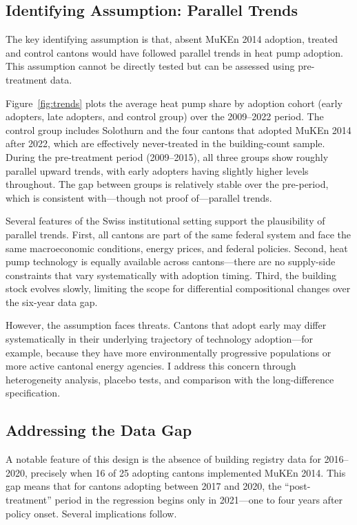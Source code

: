 \documentclass[12pt]{article}
\begin{document}
\subsection{Identifying Assumption: Parallel Trends}

The key identifying assumption is that, absent MuKEn 2014 adoption, treated and control cantons would have followed parallel trends in heat pump adoption. This assumption cannot be directly tested but can be assessed using pre-treatment data.

Figure~\ref{fig:trends} plots the average heat pump share by adoption cohort (early adopters, late adopters, and control group) over the 2009--2022 period. The control group includes Solothurn and the four cantons that adopted MuKEn 2014 after 2022, which are effectively never-treated in the building-count sample. During the pre-treatment period (2009--2015), all three groups show roughly parallel upward trends, with early adopters having slightly higher levels throughout. The gap between groups is relatively stable over the pre-period, which is consistent with---though not proof of---parallel trends.

Several features of the Swiss institutional setting support the plausibility of parallel trends. First, all cantons are part of the same federal system and face the same macroeconomic conditions, energy prices, and federal policies. Second, heat pump technology is equally available across cantons---there are no supply-side constraints that vary systematically with adoption timing. Third, the building stock evolves slowly, limiting the scope for differential compositional changes over the six-year data gap.

However, the assumption faces threats. Cantons that adopt early may differ systematically in their underlying trajectory of technology adoption---for example, because they have more environmentally progressive populations or more active cantonal energy agencies. I address this concern through heterogeneity analysis, placebo tests, and comparison with the long-difference specification.

\subsection{Addressing the Data Gap}

A notable feature of this design is the absence of building registry data for 2016--2020, precisely when 16 of 25 adopting cantons implemented MuKEn 2014. This gap means that for cantons adopting between 2017 and 2020, the ``post-treatment'' period in the regression begins only in 2021---one to four years after policy onset. Several implications follow.
\end{document}
